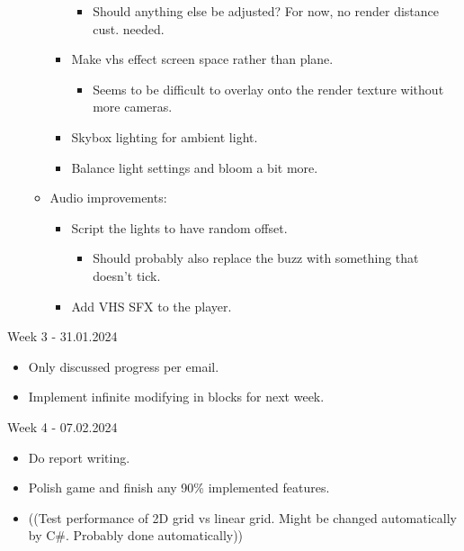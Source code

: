 \begin{itemize}
\begin{itemize}
\begin{itemize}
\begin{itemize}
                                  \item Should anything else be adjusted? For now, no render distance cust. needed.
                              \end{itemize}
                        \item Make vhs effect screen space rather than plane.
                              \begin{itemize}
                                  \item Seems to be difficult to overlay onto the render texture without more cameras.
                              \end{itemize}
                        \item Skybox lighting for ambient light.
                        \item Balance light settings and bloom a bit more.
                    \end{itemize}
              \item Audio improvements:
                    \begin{itemize}
                        \item Script the lights to have random offset.
                              \begin{itemize}
                                  \item Should probably also replace the buzz with something that doesn’t tick.
                              \end{itemize}
                        \item Add VHS SFX to the player.
                    \end{itemize}
          \end{itemize}
\end{itemize}

\noindent Week 3 - 31.01.2024
\begin{itemize}
    \item Only discussed progress per email.
    \item Implement infinite modifying in blocks for next week.
\end{itemize}

\noindent Week 4 - 07.02.2024
\begin{itemize}
    \item Do report writing.
    \item Polish game and finish any 90\% implemented features.
    \item ((Test performance of 2D grid vs linear grid. Might be changed automatically by C\#. Probably done automatically))
\end{itemize}

